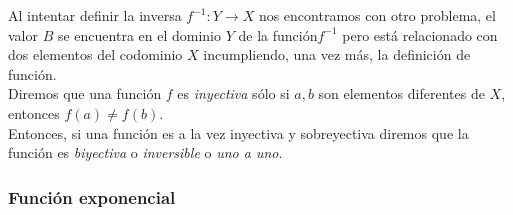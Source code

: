 \documentclass[../Teoría.root.tex]{subfiles}
\begin{document}
        Al intentar definir la inversa \(f^{−1}: Y\rightarrow X\) nos encontramos con otro problema, el valor \(B\) se encuentra en el dominio \(Y\) de la función\(f^{−1}\) pero está relacionado con dos elementos del codominio \(X\) incumpliendo, una vez más, la definición de función.\\
        Diremos que una función \(f\) es \textit{inyectiva} sólo si \(a,b\) son elementos diferentes de \(X\), entonces \(f(a)\neq f(b)\).\\
        Entonces, si una función es a la vez inyectiva y sobreyectiva diremos que la función es \textit{biyectiva} o \textit{inversible} o \textit{uno a uno}.
        \subsubsection{Función exponencial}
\end{document}
